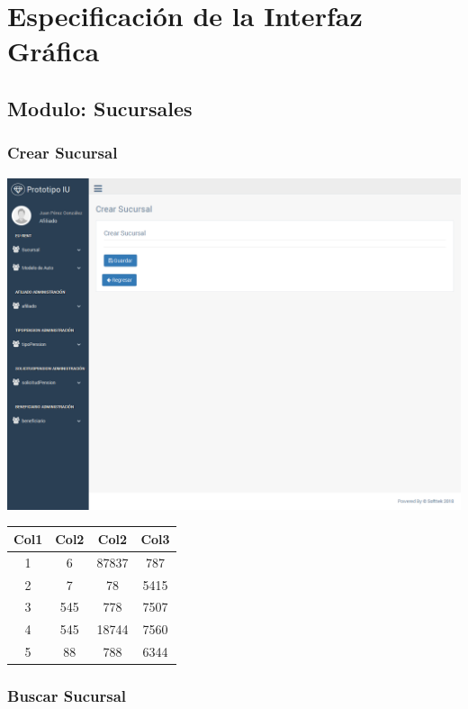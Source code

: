 
\chapter{Especificación de la Interfaz Gráfica}

\section{Modulo: Sucursales}

\subsection{Crear Sucursal}

\includegraphics[width=\linewidth]{ui-prototype/SucursalServices/CrearSucursalPage.png}

\begin{center}
 \begin{tabular}{|c c c c|} 
 \hline
 Col1 & Col2 & Col2 & Col3 \\ [0.5ex] 
 \hline\hline
 1 & 6 & 87837 & 787 \\ 
 \hline
 2 & 7 & 78 & 5415 \\
 \hline
 3 & 545 & 778 & 7507 \\
 \hline
 4 & 545 & 18744 & 7560 \\
 \hline
 5 & 88 & 788 & 6344 \\ [1ex] 
 \hline
\end{tabular}
\end{center}



\subsection{Buscar Sucursal}

